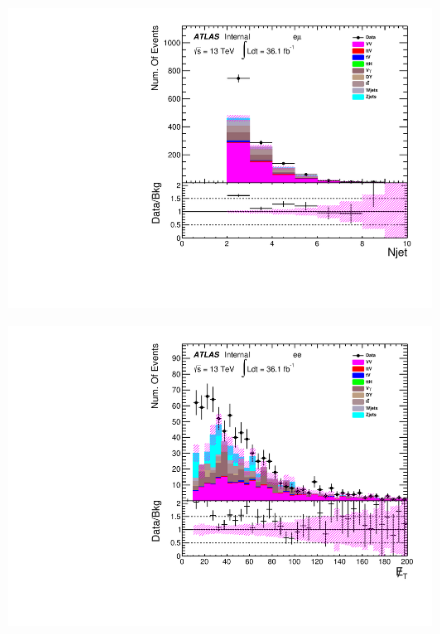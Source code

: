 \begin{figure}[h]
\begin{minipage}[t]{0.3\linewidth}
 \label{fig:nominal:numOfjet_mumu.pdf}
 \end{minipage}
\begin{minipage}[t]{0.3\linewidth}
 \centering
 \includegraphics[width=1.0\textwidth,angle=-90]{fig/nominal/numOfjet_emu.pdf}
 \label{fig:nominal:numOfjet_emu.pdf}
 \end{minipage}
\begin{minipage}[t]{0.3\linewidth}
 \centering
 \includegraphics[width=1.0\textwidth,angle=-90]{fig/nominal/MET_ee.pdf}
 \label{fig:nominal:MET_ee.pdf}
 \end{minipage}
\begin{minipage}[t]{0.3\linewidth}
 \centering

\end{minipage}
\end{figure}
